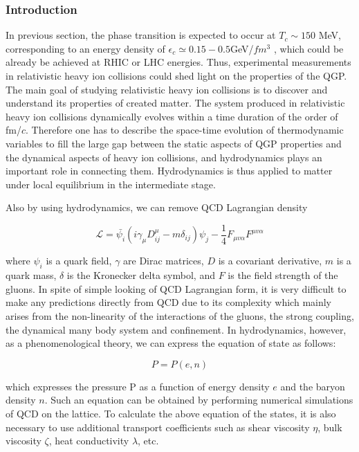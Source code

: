 \subsubsection{Introduction}
  In previous section, the phase transition is expected to occur at $T_c \sim 150$ MeV, corresponding to an energy density of $\epsilon_c \simeq 0.15 - 0.5$GeV/$fm^3$ \cite{Bazavov:2014pvz}, which could be already be achieved at RHIC or LHC energies. Thus, experimental measurements in relativistic heavy ion collisions could shed light on the properties of the QGP. The main goal of studying relativistic heavy ion collisions is to discover and understand its properties of created matter. The system produced in relativistic heavy ion collisions dynamically evolves within a time duration of the order of fm/$c$. Therefore one has to describe the space-time evolution of thermodynamic variables to fill the large gap between the static aspects of QGP properties and the dynamical aspects of heavy ion collisions, and hydrodynamics plays an important role in connecting them. Hydrodynamics is thus applied to matter under local equilibrium in the intermediate stage.

Also by using hydrodynamics, we can remove QCD Lagrangian density

\begin{equation}
	\mathcal{L} = \bar{\psi_i}(i\gamma_\mu D^{\mu}_{ij} - m \delta_{ij})\psi_j - \frac{1}{4}F_{\mu v \alpha}F^{\mu v \alpha} 
\end{equation}
\smallskip

	where $\psi_i$ is a quark field, $\gamma$ are Dirac matrices, $D$ is a covariant derivative, $m$ is a quark mass, $\delta$ is the Kronecker delta symbol, and $F$ is the field strength of the gluons. In spite of simple looking of QCD Lagrangian form, it is very difficult to make any predictions directly from QCD due to its complexity which mainly arises from the non-linearity of the interactions of the gluons, the strong coupling, the dynamical many body system and confinement. In hydrodynamics, however, as a phenomenological theory, we can express the equation of state as follows: 
	
	\begin{equation}
		P = P(e, n)
	\end{equation}
	\smallskip 
	
	which expresses the pressure P as a function of energy density $e$ and the baryon density $n$. Such an equation can be obtained by performing numerical simulations of QCD on the lattice. To calculate the above equation of the states, it is also necessary to use additional transport coefficients such as shear viscosity $\eta$, bulk viscosity $\zeta$, heat conductivity $\lambda$, etc. 
	
